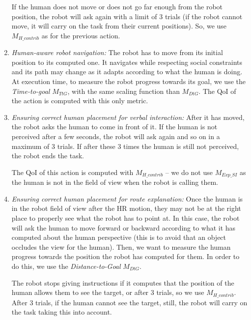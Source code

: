 \documentclass[a4paper,11pt,twoside]{StyleThese}
\begin{document}
\begin{enumerate}[label=(\alph*)]
	If the human does not move or does not go far enough from the robot position, the robot will ask again with a limit of 3 trials (if the robot cannot move, it will carry on the task from their current positions). So, we use $M_{H\_contrib}$ as for the previous action. 
	
	\item \label{list_act:nav} \emph{Human-aware robot navigation: }The robot has to move from its initial position to its computed one. It navigates while respecting social constraints and its path may change as it adapts according to what the human is doing. At execution time, to measure the robot progress towards its goal, we use the \emph{Time-to-goal} $M_{TtG}$, with the same scaling function than $M_{DtG}$. The QoI of the action is computed with this only metric. 
	
	\item \label{list_act:correct_place1} \emph{Ensuring correct human placement for verbal interaction: }After it has moved, the robot asks the human to come in front of it. If the human is not perceived after a few seconds, the robot will ask again and so on in a maximum of 3 trials. If after these 3 times the human is still not perceived, the robot ends the task. 
	
	The QoI of this action is computed with $M_{H\_contrib}$ -- we do not use $M_{Exp\_SI}$ as the human is not in the field of view when the robot is calling them.
	
	\item \label{list_act:correct_place2} \emph{Ensuring correct human placement for route explanation: }Once the human is in the robot field of view after the HR motion, they may not be at the right place to properly see what the robot has to point at. In this case, the robot will ask the human to move forward or backward according to what it has computed about the human perspective (\eg this is to avoid that an object occludes the view for the human). Then, we want to measure the human progress towards the position the robot has computed for them. In order to do this, we use the \emph{Distance-to-Goal} $M_{DtG}$.
	
	The robot stops giving instructions if it computes that the position of the human allows them to see the target, or after 3 trials, so we use $M_{H\_contrib}$. After 3 trials, if the human cannot see the target, still, the robot will carry on the task taking this into account.
	
	
\end{enumerate}
\end{document}
